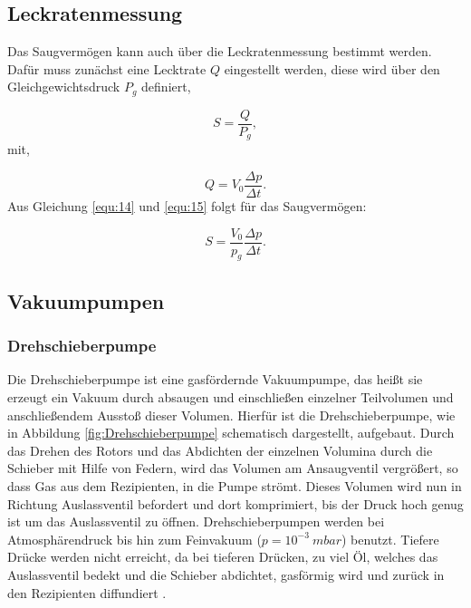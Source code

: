 \subsection{Leckratenmessung}
Das Saugvermögen kann auch über die Leckratenmessung bestimmt werden.
Dafür muss zunächst eine Lecktrate $Q$ eingestellt werden, diese wird über den Gleichgewichtsdruck $P_g$ definiert,

    \begin{equation}
    \label{equ:14}
        S = \frac{Q}{P_g},
    \end{equation}
mit,

    \begin{equation}
    \label{equ:15}
        Q = V_0 \frac{\Delta p}{\Delta t}.
    \end{equation}
Aus Gleichung \eqref{equ:14} und \eqref{equ:15} folgt für das Saugvermögen:

    \begin{equation}
    \label{equ:16}
        S = \frac{V_0}{p_g} \frac{\Delta p}{\Delta t}.
    \end{equation}
    

\subsection{Vakuumpumpen}
\subsubsection{Drehschieberpumpe}
Die Drehschieberpumpe ist eine gasfördernde Vakuumpumpe, das heißt sie erzeugt ein Vakuum durch absaugen und
einschließen einzelner Teilvolumen und anschließendem Ausstoß dieser Volumen.
Hierfür ist die Drehschieberpumpe, wie in Abbildung \ref{fig:Drehschieberpumpe} schematisch dargestellt, aufgebaut.
Durch das Drehen des Rotors und das Abdichten der einzelnen Volumina durch die Schieber mit Hilfe von Federn, 
wird das Volumen am Ansaugventil vergrößert, so dass Gas aus dem Rezipienten, in die Pumpe strömt. Dieses Volumen wird nun 
in Richtung Auslassventil befordert und dort komprimiert, bis der Druck hoch genug ist um das Auslassventil zu öffnen.
Drehschieberpumpen werden bei Atmosphärendruck bis hin zum Feinvakuum ($p = 10^{-3}\: mbar$) benutzt.
Tiefere Drücke werden nicht erreicht, da bei tieferen Drücken, zu viel Öl, welches das Auslassventil bedekt und die Schieber abdichtet, 
gasförmig wird und zurück in den Rezipienten diffundiert \cite{Pfeiffer, S.60,61}. 
    

